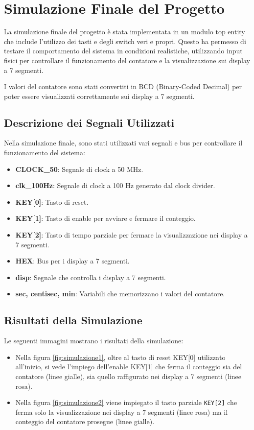 \documentclass{article}
\begin{document}
\newpage

\section{Simulazione Finale del Progetto}
La simulazione finale del progetto è stata implementata in un modulo top entity che include l'utilizzo dei tasti e degli switch veri e propri. Questo ha permesso di testare il comportamento del sistema in condizioni realistiche, utilizzando input fisici per controllare il funzionamento del contatore e la visualizzazione sui display a 7 segmenti.

I valori del contatore sono stati convertiti in BCD (Binary-Coded Decimal) per poter essere visualizzati correttamente sui display a 7 segmenti.

\subsection{Descrizione dei Segnali Utilizzati}
Nella simulazione finale, sono stati utilizzati vari segnali e bus per controllare il funzionamento del sistema:
\begin{itemize}
    \item \textbf{CLOCK\_50}: Segnale di clock a 50 MHz.
    \item \textbf{clk\_100Hz}: Segnale di clock a 100 Hz generato dal clock divider.
    \item \textbf{KEY[0]}: Tasto di reset.
    \item \textbf{KEY[1]}: Tasto di enable per avviare e fermare il conteggio.
    \item \textbf{KEY[2]}: Tasto di tempo parziale per fermare la visualizzazione nei display a 7 segmenti.
    \item \textbf{HEX}: Bus per i display a 7 segmenti.
    \item \textbf{disp}: Segnale che controlla i display a 7 segmenti.
    \item \textbf{sec, centisec, min}: Variabili che memorizzano i valori del contatore.
\end{itemize}

\subsection{Risultati della Simulazione}
Le seguenti immagini mostrano i risultati della simulazione:

\begin{itemize}
    \item Nella figura \ref{fig:simulazione1}, oltre al tasto di reset KEY[0] utilizzato all'inizio, si vede l'impiego dell'enable KEY[1] che ferma il conteggio sia del contatore (linee gialle), sia quello raffigurato nei display a 7 segmenti (linee rosa).
    \item Nella figura \ref{fig:simulazione2} viene impiegato il tasto parziale \texttt{KEY[2]} che ferma solo la visualizzazione nei display a 7 segmenti (linee rosa) ma il conteggio del contatore prosegue (linee gialle).
\end{itemize}
\end{document}
